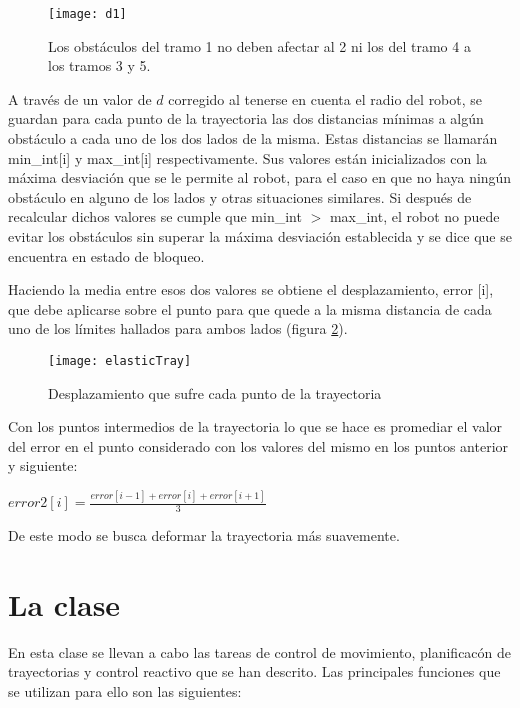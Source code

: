 \begin{figure}[h]
  \centering\texttt{[image: d1]}\\
  \caption{Los obstáculos del tramo 1 no deben afectar al 2 ni los del tramo 4 a los tramos 3 y 5.}\label{fg:d1}
\end{figure}

A través de un valor de $d$ corregido al tenerse en cuenta el radio del robot, se guardan para cada punto de la trayectoria las dos distancias mínimas a algún obstáculo a cada uno de los dos lados de la misma. Estas distancias se llamarán min\_int[i] y max\_int[i] respectivamente. Sus valores están inicializados con la máxima desviación que se le permite al robot, para el caso en que no haya ningún obstáculo en alguno de los lados y otras situaciones similares. Si después de recalcular dichos valores se cumple que min\_int $>$ max\_int, el robot no puede evitar los obstáculos sin superar la máxima desviación establecida y se dice que se encuentra en estado de bloqueo.

Haciendo la media entre esos dos valores se obtiene el desplazamiento, error [i], que debe aplicarse sobre el punto para que quede a la misma distancia de cada uno de los límites hallados para ambos lados (figura \ref{fg:elasticTray}).

\begin{figure}[h]
  \centering\texttt{[image: elasticTray]}\\
  \caption{Desplazamiento que sufre cada punto de la trayectoria}\label{fg:elasticTray}
\end{figure}

Con los puntos intermedios de la trayectoria lo que se hace es promediar el valor del error en el punto considerado con los valores del mismo en los puntos anterior y siguiente:

\begin{center}
$error2[i] = \frac{error[i-1] + error[i] + error[i+1]}{3}$
\end{center}

\noindent
De este modo se busca deformar la trayectoria más suavemente.

\section{La clase }
En esta clase se llevan a cabo las tareas de control de movimiento, planificacón de trayectorias y control reactivo que se han descrito. Las principales funciones que se utilizan para ello son las siguientes:

